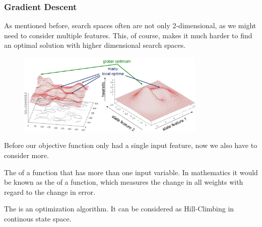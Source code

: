 \documentclass[
../../EiKI_Summary.tex,
]
{subfiles}
\begin{document}
\subsubsection{Gradient Descent}
As mentioned before, search spaces often are not only 2-dimensional, as we might need to consider multiple features. This, of course, makes it much harder to find an optimal solution with higher dimensional search spaces.

\begin{figure}
    [H]
    \centering
    \includegraphics[width=0.8\textwidth]{Pics/04/MultiDimensionalSearchSpace.png}
\end{figure}

Before our objective function only had a single input feature, now we also have to consider more.

\begin{minipage}
    [t]{0.5\textwidth}
    \begin{defbox}
        [Gradient]
        The  of a function that has more than one input variable. In mathematics it would be known as the  of a function, which measures the change in all weights with regard to the change in error.
    \end{defbox}
\end{minipage}
\begin{minipage}
    [t]{0.5\textwidth}
    \begin{defbox}
        The  is an optimization algorithm. It can be considered as Hill-Climbing in continous state space.
    \end{defbox}
\end{minipage}
\end{document}
